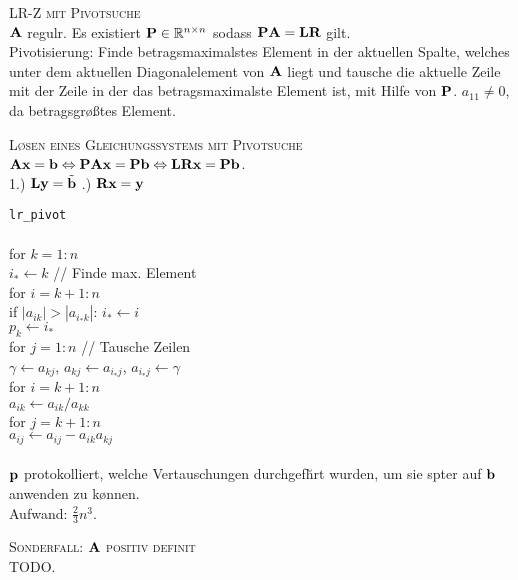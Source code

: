 \textsc{LR-Z mit Pivotsuche}\\
$\mbox{\bf A}$ regul\a r. Es existiert $\mbox{\bf P} \in \mathbb{R}^{n \times n}$ sodass $\mbox{\bf P}\mbox{\bf A}=\mbox{\bf L}\mbox{\bf R}$ gilt. \\
Pivotisierung: Finde betragsmaximalstes Element in der aktuellen Spalte, welches unter dem aktuellen Diagonalelement von $\mbox{\bf A}$ liegt und tausche die aktuelle Zeile mit der Zeile in der das betragsmaximalste Element ist, mit Hilfe von $\mbox{\bf P}$. $a_{11} \neq 0$, da betragsgr\o \ss tes Element.\vspace{0.2cm}

\textsc{L\o sen eines Gleichungssystems mit Pivotsuche}\\
$\mbox{\bf A}\mbox{\bf x} = \mbox{\bf b} \Leftrightarrow \mbox{\bf P}\mbox{\bf A}\mbox{\bf x} = \mbox{\bf P}\mbox{\bf b} \Leftrightarrow \mbox{\bf L}\mbox{\bf R}\mbox{\bf x}=\mbox{\bf P}\mbox{\bf b}$.\\
1.) $\mbox{\bf Ly}=\tilde{\mbox{\bf b}}$ .) $\mbox{\bf Rx} = \mbox{\bf y}$

\verb!lr_pivot!\\
{\addtolength{\leftskip}{0mm}
\hrulefill\\
for $k=1:n$\\
\quad $i_* \leftarrow k$ \qquad\qquad // Finde max. Element \\ 
\quad for $i=k+1:n$ \\ 
\qquad if $|a_{ik}| > |a_{i_*k}|$: $i_* \leftarrow i$ \\
\quad $p_k \leftarrow i_*$ \\
\quad for $j=1:n$ \qquad // Tausche Zeilen \\ 
\qquad $\gamma \leftarrow a_{kj}$, $a_{kj} \leftarrow a_{i_*j}$, $a_{i_*j} \leftarrow \gamma$\\
\quad for $i=k+1:n$ \\ 
\qquad $a_{ik} \leftarrow a_{ik}/a_{kk}$ \\
\qquad for $j=k+1:n$\\
\qquad\quad $a_{ij} \leftarrow a_{ij}-a_{ik}a_{kj}$\\
\hrulefill\\
}
$\mbox{\bf p}$ protokolliert, welche Vertauschungen durchgef\u hrt wurden, um sie sp\a ter auf $\mbox{\bf b}$ anwenden zu k\o nnen.\\
Aufwand: $\frac{2}{3}n^3$.\vspace{0.2cm}

\textsc{Sonderfall: $\mbox{\bf A}$ positiv definit}\\
TODO.


